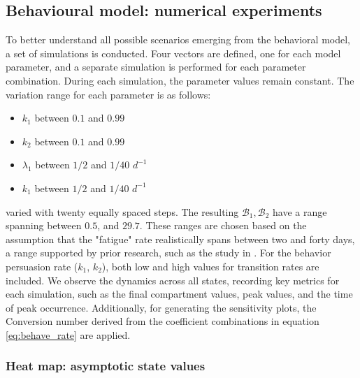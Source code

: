 \subsection{Behavioural model: numerical experiments}
To better understand all possible scenarios emerging from the behavioral model, a set of simulations is conducted. Four vectors are defined, one for each model parameter, and a separate simulation is performed for each parameter combination. During each simulation, the parameter values remain constant. The variation range for each parameter is as follows:
\begin{itemize}
	\item $k_1$ between $0.1$ and $0.99$
	\item $k_2$ between $0.1$ and $0.99$
	\item $\lambda_1$ between $1/2$ and $1/40$ $d^{-1}$
	\item $k_1$ between $1/2$ and $1/40$ $d^{-1}$
\end{itemize}
varied with twenty equally spaced steps.
The resulting $\mathcal{B}_1, \mathcal{B}_2$ have a range spanning between $0.5$, and $29.7$.
These ranges are chosen based on the assumption that the "fatigue" rate realistically spans between two and forty days, a range supported by prior research, such as the study in \cite{Kwasnicka_2016}. For the behavior persuasion rate ($k_1$, $k_2$), both low and high values for transition rates are included. We observe the dynamics across all states, recording key metrics for each simulation, such as the final compartment values, peak values, and the time of peak occurrence. Additionally, for generating the sensitivity plots, the Conversion number derived from the coefficient combinations in equation \eqref{eq:behave_rate} are applied. 

\subsubsection{Heat map: asymptotic state values}


